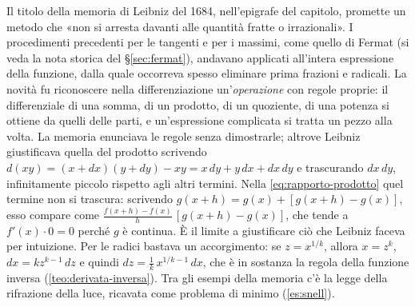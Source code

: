 \begin{notastorica}
Il titolo della memoria di Leibniz del 1684, nell'epigrafe del capitolo, promette un
metodo che «non si arresta davanti alle quantità fratte o irrazionali». I procedimenti
precedenti per le tangenti e per i massimi, come quello di Fermat (si veda la nota storica
del \S\ref{sec:fermat}), andavano applicati all'intera espressione della funzione, dalla
quale occorreva spesso eliminare prima frazioni e radicali. La novità fu riconoscere
nella differenziazione un'\emph{operazione} con regole proprie: il differenziale di una
somma, di un prodotto, di un quoziente, di una potenza si ottiene da quelli delle parti, e
un'espressione complicata si tratta un pezzo alla volta. La memoria enunciava le regole
senza dimostrarle; altrove Leibniz giustificava quella del prodotto scrivendo
$d(xy)=(x+dx)(y+dy)-xy=x\,dy+y\,dx+dx\,dy$ e trascurando $dx\,dy$, infinitamente
piccolo rispetto agli altri termini. Nella
\eqref{eq:rapporto-prodotto} quel termine non si trascura: scrivendo
$g(x+h)=g(x)+[g(x+h)-g(x)]$, esso compare come
$\frac{f(x+h)-f(x)}{h}\,[g(x+h)-g(x)]$, che tende a $f'(x)\cdot0=0$ perché $g$ è continua.
È il limite a giustificare ciò che Leibniz faceva per intuizione. Per le radici bastava
un accorgimento: se $z=x^{1/k}$, allora $x=z^{k}$, $dx=kz^{k-1}\,dz$ e quindi
$dz=\frac1k\,x^{1/k-1}\,dx$, che è in sostanza la regola della funzione inversa
(\cref{teo:derivata-inversa}). Tra gli esempi della memoria c'è la legge della rifrazione
della luce, ricavata come problema di minimo (\cref{es:snell}).
\end{notastorica}
